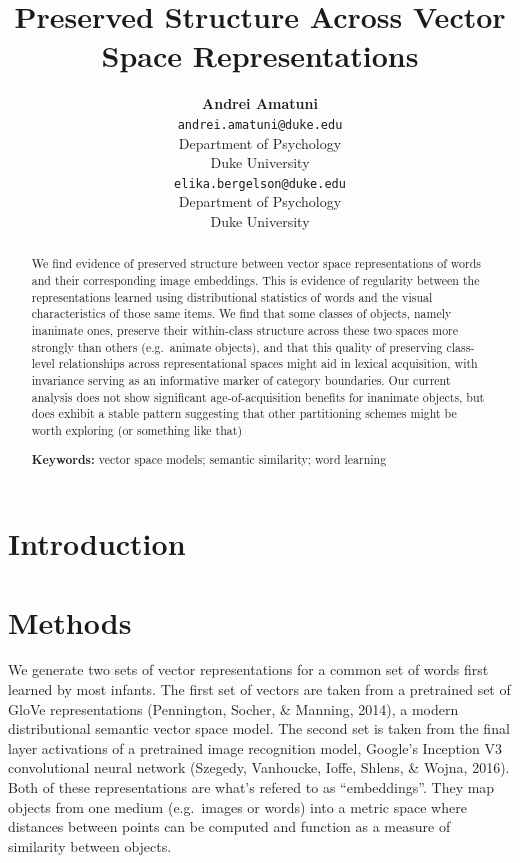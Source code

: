 \documentclass[10pt, letterpaper]{article}
\title{Preserved Structure Across Vector Space Representations}
\author{{\large \bf Andrei Amatuni} \\ \texttt{andrei.amatuni@duke.edu} \\ Department of Psychology \\ Duke University \And {\large \bf Elika Bergelson} \\ \texttt{elika.bergelson@duke.edu} \\ Department of Psychology \\ Duke University}
\begin{document}
\maketitle

\begin{abstract}
We find evidence of preserved structure between vector space
representations of words and their corresponding image embeddings. This
is evidence of regularity between the representations learned using
distributional statistics of words and the visual characteristics of
those same items. We find that some classes of objects, namely inanimate
ones, preserve their within-class structure across these two spaces more
strongly than others (e.g.~animate objects), and that this quality of
preserving class-level relationships across representational spaces
might aid in lexical acquisition, with invariance serving as an
informative marker of category boundaries. Our current analysis does not
show significant age-of-acquisition benefits for inanimate objects, but
does exhibit a stable pattern suggesting that other partitioning schemes
might be worth exploring (or something like that)

\textbf{Keywords:}
vector space models; semantic similarity; word learning
\end{abstract}

\section{Introduction}\label{introduction}

\section{Methods}\label{methods}

We generate two sets of vector representations for a common set of words
first learned by most infants. The first set of vectors are taken from a
pretrained set of GloVe representations (Pennington, Socher, \& Manning,
2014), a modern distributional semantic vector space model. The second
set is taken from the final layer activations of a pretrained image
recognition model, Google's Inception V3 convolutional neural network
(Szegedy, Vanhoucke, Ioffe, Shlens, \& Wojna, 2016). Both of these
representations are what's refered to as ``embeddings''. They map
objects from one medium (e.g.~images or words) into a metric space where
distances between points can be computed and function as a measure of
similarity between objects.
\end{document}
